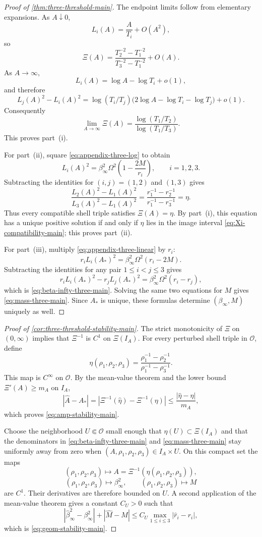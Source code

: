 \begin{proof}[Proof of \cref{thm:three-threshold-main}]
The endpoint limits follow from elementary expansions. As $A\downarrow0$,
\[
L_i(A)=\frac{A}{T_i}+O(A^2),
\]
so
\[
\Xi(A)=
\frac{T_2^{-2}-T_1^{-2}}{T_3^{-2}-T_1^{-2}}
+O(A).
\]
As $A\to\infty$,
\[
L_i(A)=\log A-\log T_i+o(1),
\]
and therefore
\[
L_j(A)^2-L_i(A)^2
=
\log(T_i/T_j)\bigl(2\log A-\log T_i-\log T_j\bigr)+o(1).
\]
Consequently
\[
\lim_{A\to\infty}\Xi(A)=
\frac{\log(T_1/T_2)}{\log(T_1/T_3)}.
\]
This proves part~\textup{(i)}.

For part~\textup{(ii)}, square \eqref{eq:appendix-three-log} to obtain
\begin{equation}\label{eq:appendix-three-linear}
L_i(A)^2=\beta_\infty^2\Omega^2\left(1-\frac{2M}{r_i}\right),
\qquad i=1,2,3.
\end{equation}
Subtracting the identities for $(i,j)=(1,2)$ and $(1,3)$ gives
\[
\frac{L_2(A)^2-L_1(A)^2}{L_3(A)^2-L_1(A)^2}
=
\frac{r_1^{-1}-r_2^{-1}}{r_1^{-1}-r_3^{-1}}
=
\eta.
\]
Thus every compatible shell triple satisfies $\Xi(A)=\eta$. By part~\textup{(i)}, this equation has a unique positive solution if and only if $\eta$ lies in the image interval \eqref{eq:Xi-compatibility-main}; this proves part~\textup{(ii)}.

For part~\textup{(iii)}, multiply \eqref{eq:appendix-three-linear} by $r_i$:
\[
r_iL_i(A_\ast)^2
=
\beta_\infty^2\Omega^2(r_i-2M).
\]
Subtracting the identities for any pair $1\le i<j\le3$ gives
\[
r_iL_i(A_\ast)^2-r_jL_j(A_\ast)^2
=
\beta_\infty^2\Omega^2(r_i-r_j),
\]
which is \eqref{eq:beta-infty-three-main}. Solving the same two equations for $M$ gives \eqref{eq:mass-three-main}. Since $A_\ast$ is unique, these formulas determine $(\beta_\infty,M)$ uniquely as well.
\end{proof}

\begin{proof}[Proof of \cref{cor:three-threshold-stability-main}]
The strict monotonicity of $\Xi$ on $(0,\infty)$ implies that $\Xi^{-1}$ is $C^1$ on $\Xi(I_A)$. For every perturbed shell triple in $\mathcal O$, define
\[
\eta(\rho_1,\rho_2,\rho_3)
=
\frac{\rho_1^{-1}-\rho_2^{-1}}{\rho_1^{-1}-\rho_3^{-1}}.
\]
This map is $C^\infty$ on $\mathcal O$. By the mean-value theorem and the lower bound $\Xi'(A)\ge m_A$ on $I_A$,
\[
|\widehat A-A_\ast|
=
|\Xi^{-1}(\widehat\eta)-\Xi^{-1}(\eta)|
\le
\frac{|\widehat\eta-\eta|}{m_A},
\]
which proves \eqref{eq:amp-stability-main}.

Choose the neighborhood $U\Subset\mathcal O$ small enough that $\eta(U)\subset\Xi(I_A)$ and that the denominators in \eqref{eq:beta-infty-three-main} and \eqref{eq:mass-three-main} stay uniformly away from zero when $(A,\rho_1,\rho_2,\rho_3)\in I_A\times U$. On this compact set the maps
\[
(\rho_1,\rho_2,\rho_3)\longmapsto A=\Xi^{-1}(\eta(\rho_1,\rho_2,\rho_3)),
\]
\[
(\rho_1,\rho_2,\rho_3)\longmapsto \beta_\infty^2,
\qquad
(\rho_1,\rho_2,\rho_3)\longmapsto M
\]
are $C^1$. Their derivatives are therefore bounded on $U$. A second application of the mean-value theorem gives a constant $C_U>0$ such that
\[
|\widehat\beta_\infty^2-\beta_\infty^2|
+
|\widehat M-M|
\le
C_U\max_{1\le i\le3}|\widehat r_i-r_i|,
\]
which is \eqref{eq:geom-stability-main}.
\end{proof}

